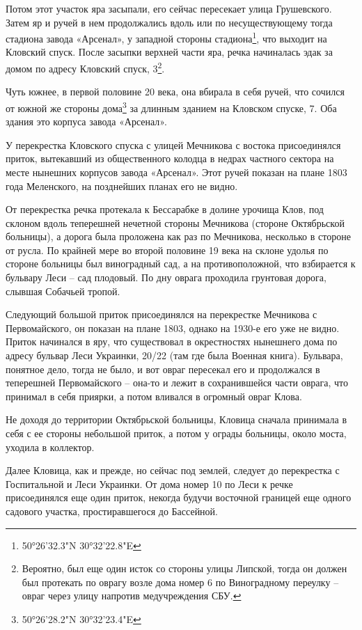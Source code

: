 Потом этот участок яра засыпали, его сейчас пересекает улица Грушевского. Затем яр и ручей в нем продолжались вдоль или по несуществующему тогда стадиона завода «Арсенал», у западной стороны стадиона\footnote{50°26'32.3"N 30°32'22.8"E}, что выходит на Кловский спуск. После засыпки верхней части яра, речка начиналась эдак за домом по адресу Кловский спуск, 3\footnote{Вероятно, был еще один исток со стороны улицы Липской, тогда он должен был протекать по оврагу возле дома номер 6 по Виноградному переулку – овраг через улицу напротив медучреждения СБУ.}. 

Чуть южнее, в первой половине 20 века, она вбирала в себя ручей, что сочился от южной же стороны дома\footnote{50°26'28.2"N 30°32'23.4"E} за длинным зданием на Кловском спуске, 7. Оба здания это корпуса завода «Арсенал».

У перекрестка Кловского спуска с улицей Мечникова с востока присоединялся приток, вытекавший из общественного колодца в недрах частного сектора на месте нынешних корпусов завода «Арсенал». Этот ручей показан на плане 1803 года Меленского, на позднейших планах его не видно.

От перекрестка речка протекала к Бессарабке в долине урочища Клов, под склоном вдоль теперешней нечетной стороны Мечникова (стороне Октябрьской больницы), а дорога была проложена как раз по Мечникова, несколько в стороне от русла. По крайней мере во второй половине 19 века на склоне удолья по стороне больницы был виноградный сад, а на противоположной, что взбирается к бульвару Леси – сад плодовый. По дну оврага проходила грунтовая дорога, слывшая Собачьей тропой.

Следующий большой приток присоединялся на перекрестке Мечникова с Первомайского, он показан на плане 1803, однако на 1930-е его уже не видно. Приток начинался в яру, что существовал в окрестностях нынешнего дома по адресу бульвар Леси Украинки, 20/22 (там где была Военная книга). Бульвара, понятное дело, тогда не было, и вот овраг пересекал его и продолжался в теперешней Первомайского – она-то и лежит в сохранившейся части оврага, что принимал в себя приярки, а потом вливался в огромный овраг Клова.

Не доходя до территории Октябрьской больницы, Кловица сначала принимала в себя с ее стороны небольшой приток, а потом у ограды больницы, около моста, уходила в коллектор.

Далее Кловица, как и прежде, но сейчас под землей, следует до перекрестка с Госпитальной и Леси Украинки. От дома номер 10 по Леси к речке присоединялся еще один приток, некогда будучи восточной границей еще одного садового участка, простиравшегося до Бассейной.

